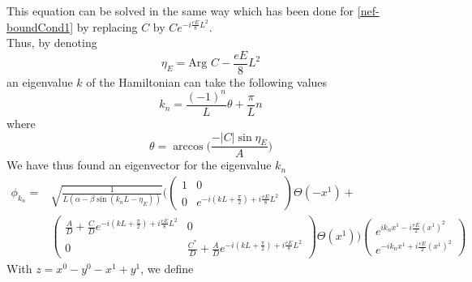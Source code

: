 This equation can be solved in the same way which has been done for \cref{nef-boundCond1} by replacing $C$ by $Ce^{-i\frac{eE}{8}L^2}$. \\
Thus, by denoting 
\begin{equation*}
\eta_E = \textrm{Arg } C - \frac{eE}{8}L^2 
\end{equation*}
an eigenvalue $k$ of the Hamiltonian can take the following values
\begin{equation*}
k_{n} = \frac{(-1)^n}{L} \theta+ \frac{\pi}{L}n 
\end{equation*}
where 
\begin{equation*}
\theta = \arccos\bigg( \frac{-|C| \sin \eta_E}{A} \bigg)
\end{equation*}
We have thus found an eigenvector for the eigenvalue $k_n$
\begin{equation} 
\begin{split}
\phi_{k_{n}} = 
& \sqrt{\frac{1}{L(\alpha - \beta \sin (k_{n}L - \eta_E))}} \Bigg( 
\begin{pmatrix}
1 & 0 \\
0  & e^{-i(kL + \frac{\pi}{2}) + i\frac{eE}{8}L^2}
\end{pmatrix}
\Theta(-x^1) + \\
& \begin{pmatrix}
\frac{A}{D}  +  \frac{C}{D} e^{-i(kL + \frac{\pi}{2})+ i\frac{eE}{8}L^2} & 0 \\
0  & \frac{C^*}{D}  + \frac{A}{D}e^{-i(kL + \frac{\pi}{2} ) + i\frac{eE}{8}L^2}
\end{pmatrix}\Theta(x^1)\Bigg)
\begin{pmatrix}
e^{ik_{n} x^1 -  i\frac{eE}{2}(x^1)^2} \\
e^{- ik_{n} x^1 + i\frac{eE}{2}(x^1)^2}
\end{pmatrix}
\end{split}
\end{equation}
With $z = x^0 - y^0 - x^1 + y^1$, we define
